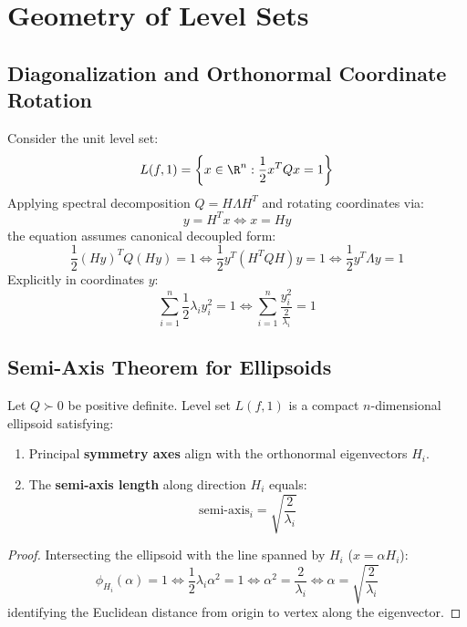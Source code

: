 \FloatBarrier
\section{Geometry of Level Sets}
\label{sec:opt-level-set-geometry-en}

\subsection{Diagonalization and Orthonormal Coordinate Rotation}
Consider the unit level set:
\begin{equation}
L(f, 1) = \left\{x \in \R^n : \frac{1}{2} x^T Q x = 1\right\}
\end{equation}
Applying spectral decomposition $Q = H \Lambda H^T$ and rotating coordinates via:
\begin{equation}
y = H^T x \iff x = H y
\end{equation}
the equation assumes canonical decoupled form:
\begin{equation}
\frac{1}{2} (H y)^T Q (H y) = 1 \iff \frac{1}{2} y^T (H^T Q H) y = 1 \iff \frac{1}{2} y^T \Lambda y = 1
\end{equation}
Explicitly in coordinates $y$:
\begin{equation}
\sum_{i=1}^n \frac{1}{2} \lambda_i y_i^2 = 1 \iff \sum_{i=1}^n \frac{y_i^2}{\frac{2}{\lambda_i}} = 1
\end{equation}

\subsection{Semi-Axis Theorem for Ellipsoids}
\begin{theorem}
Let $Q \succ 0$ be positive definite. Level set $L(f, 1)$ is a compact $n$-dimensional ellipsoid satisfying:
\begin{enumerate}
    \item Principal \textbf{symmetry axes} align with the orthonormal eigenvectors $H_i$.
    \item The \textbf{semi-axis length} along direction $H_i$ equals:
    \begin{equation}
    \text{semi-axis}_i = \sqrt{\frac{2}{\lambda_i}}
    \end{equation}
\end{enumerate}
\end{theorem}

\begin{proof}
Intersecting the ellipsoid with the line spanned by $H_i$ ($x = \alpha H_i$):
\begin{equation}
\phi_{H_i}(\alpha) = 1 \iff \frac{1}{2} \lambda_i \alpha^2 = 1 \iff \alpha^2 = \frac{2}{\lambda_i} \iff \alpha = \sqrt{\frac{2}{\lambda_i}}
\end{equation}
identifying the Euclidean distance from origin to vertex along the eigenvector.
\end{proof}

